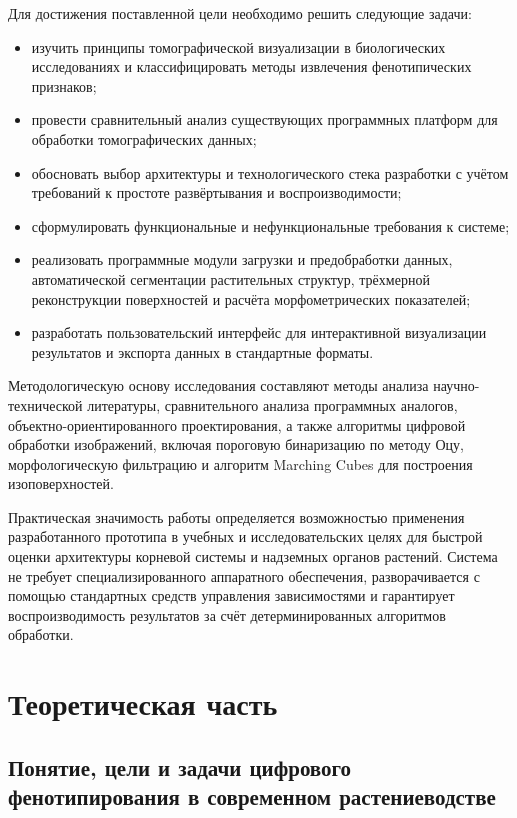 \documentclass[14pt,a4paper]{extreport}
\begin{document}
Для достижения поставленной цели необходимо решить следующие задачи:
\begin{itemize}
  \item изучить принципы томографической визуализации в биологических исследованиях и классифицировать методы извлечения фенотипических признаков;
  \item провести сравнительный анализ существующих программных платформ для обработки томографических данных;
  \item обосновать выбор архитектуры и технологического стека разработки с учётом требований к простоте развёртывания и воспроизводимости;
  \item сформулировать функциональные и нефункциональные требования к системе;
  \item реализовать программные модули загрузки и предобработки данных, автоматической сегментации растительных структур, трёхмерной реконструкции поверхностей и расчёта морфометрических показателей;
  \item разработать пользовательский интерфейс для интерактивной визуализации результатов и экспорта данных в стандартные форматы.
\end{itemize}

Методологическую основу исследования составляют методы анализа научно-технической литературы, сравнительного анализа программных аналогов, объектно-ориентированного проектирования, а также алгоритмы цифровой обработки изображений, включая пороговую бинаризацию по методу Оцу, морфологическую фильтрацию и алгоритм Marching Cubes для построения изоповерхностей.

Практическая значимость работы определяется возможностью применения разработанного прототипа в учебных и исследовательских целях для быстрой оценки архитектуры корневой системы и надземных органов растений. Система не требует специализированного аппаратного обеспечения, разворачивается с помощью стандартных средств управления зависимостями и гарантирует воспроизводимость результатов за счёт детерминированных алгоритмов обработки.

\newpage

\chapter{Теоретическая часть}

\section{Понятие, цели и задачи цифрового фенотипирования в современном растениеводстве}
\end{document}
